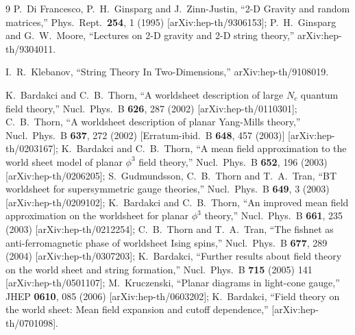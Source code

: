 \documentclass[11pt]{JHEP3}
\begin{document}
\begin{thebibliography}{9}
  P.~Di Francesco, P.~H.~Ginsparg and J.~Zinn-Justin,
  ``2-D Gravity and random matrices,''
  Phys.\ Rept.\  {\bf 254}, 1 (1995)
  [arXiv:hep-th/9306153];
  P.~H.~Ginsparg and G.~W.~Moore,
  ``Lectures on 2-D gravity and 2-D string theory,''
  arXiv:hep-th/9304011.

 I.~R.~Klebanov,
  ``String Theory In Two-Dimensions,''
  arXiv:hep-th/9108019.

K.~Bardakci and C.~B.~Thorn,
``A worldsheet description of large $N_c$ quantum field theory,''
Nucl.\ Phys.\ B {\bf 626}, 287 (2002)
[arXiv:hep-th/0110301]; C.~B.~Thorn,
``A worldsheet description of planar Yang-Mills theory,''
Nucl.\ Phys.\ B {\bf 637}, 272 (2002)
[Erratum-ibid.\ B {\bf 648}, 457 (2003)]
[arXiv:hep-th/0203167]; K.~Bardakci and C.~B.~Thorn,
``A mean field approximation to the world sheet model of planar $\phi^3$ field
theory,''
Nucl.\ Phys.\ B {\bf 652}, 196 (2003)
[arXiv:hep-th/0206205]; S.~Gudmundsson, C.~B.~Thorn and T.~A.~Tran,
``BT worldsheet for supersymmetric gauge theories,''
Nucl.\ Phys.\ B {\bf 649}, 3 (2003)
[arXiv:hep-th/0209102]; K.~Bardakci and C.~B.~Thorn,
``An improved mean field approximation on the worldsheet for planar $\phi^3$
theory,''
Nucl.\ Phys.\ B {\bf 661}, 235 (2003)
[arXiv:hep-th/0212254]; C.~B.~Thorn and T.~A.~Tran,
``The fishnet as anti-ferromagnetic phase of worldsheet Ising spins,''
Nucl.\ Phys.\ B {\bf 677}, 289 (2004)
[arXiv:hep-th/0307203];
 K.~Bardakci,
  ``Further results about field theory on the world sheet and string
  formation,''
  Nucl.\ Phys.\ B {\bf 715} (2005) 141
  [arXiv:hep-th/0501107];
  M.~Kruczenski,
  ``Planar diagrams in light-cone gauge,''
  JHEP {\bf 0610}, 085 (2006)
  [arXiv:hep-th/0603202];
K.~Bardakci,
  ``Field theory on the world sheet: Mean field expansion and cutoff
  dependence,''
  [arXiv:hep-th/0701098].


\end{thebibliography}
\end{document}
